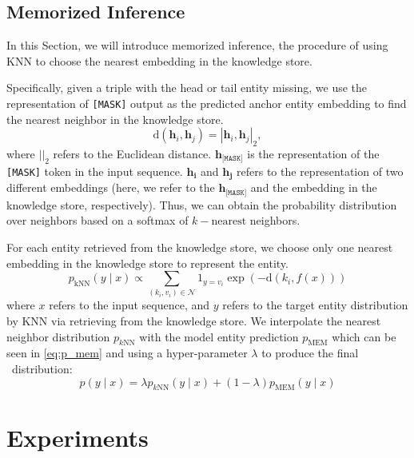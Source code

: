 \documentclass[runningheads]{llncs}
\begin{document}
\subsection{Memorized  Inference}\label{sec:memorized inference}

In this Section, we will introduce memorized inference, the procedure of using KNN to choose the nearest embedding in the knowledge store. 


Specifically, given a triple with the head or tail entity missing, we use the representation of \texttt{[MASK]} output as the predicted anchor entity embedding to find the nearest neighbor in the knowledge store. 
\begin{equation}
    \text{d}(\mathbf{h}_i, \mathbf{h}_j) = |\mathbf{h}_i, \mathbf{h}_j|_{\text{2}},
\end{equation}
where $||_{\text{2}}$ refers to the Euclidean distance.
$\mathbf{h}_{\texttt{[MASK]}}$ is the representation of the \texttt{[MASK]} token in the input sequence.
$\mathbf{h_i}$ and $\mathbf{h_j}$ refers to the representation of two different embeddings (here, we refer to the $\mathbf{h}_{\texttt{[MASK]}}$ and the embedding in the knowledge store, respectively).
Thus, we can obtain the probability distribution over neighbors based on a softmax of $k-\text{nearest}$ neighbors.

For each entity retrieved from the knowledge store, we choose only one nearest embedding in the knowledge store to represent the entity.
\begin{equation}
p_{\mathrm{kNN}}(y \mid x) \propto \sum_{\left(k_{i}, v_{i}\right) \in \mathcal{N}} 1_{y=v_{i}} \exp \left(-\text{d}\left(k_{i}, f(x)\right)\right)
\end{equation}
where $x$ refers to the input sequence, and $y$ refers to the target entity distribution by KNN via retrieving from the knowledge store.
We interpolate the nearest neighbor distribution $p_{k\text{NN}}$ with the model entity prediction $p_{\text{MEM}}$ which can be seen in \cref{eq:p_mem} and using a hyper-parameter  $\lambda$ to produce the final \ours~distribution:
\begin{equation}
p(y \mid x)=\lambda p_{k\mathrm{NN}}(y \mid x)+(1-\lambda) p_{\text{MEM}}(y \mid x)
\end{equation}





\section{Experiments}
\end{document}

